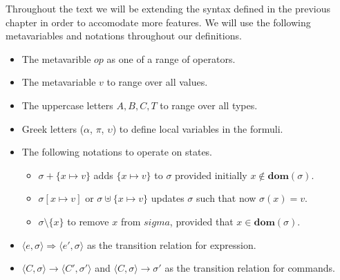 \documentclass[a4paper,12pt]{report}
\begin{document}
\par
Throughout the text we will be extending the syntax defined in the 
previous chapter in order to accomodate more features. 
We will use the following metavariables and notations throughout our 
definitions.

\renewcommand\labelitemii{$\blacksquare$}
\begin{itemize}
  \item The metavarible $op$ as one of a range of operators. 
  \item The metavariable $v$ to range over all values.
  \item The uppercase letters $A,B,C,T$ to range over all types.
  \item Greek letters ($\alpha$, $\pi$, $\upsilon$) to define local variables in 
  the formuli. 
  \item The following notations to operate on states. 
    \begin{itemize}
      \item $\sigma + \{x \mapsto v\}$ adds $\{x \mapsto v\}$ to $\sigma$ provided initially $x \notin\textbf{dom}(\sigma)$. 
      \item $\sigma[x \mapsto v]$ or $\sigma \uplus \{x \mapsto v\}$ updates $\sigma$ such that now $\sigma(x) = v$.
      \item $\sigma \setminus \{x\}$ to remove $x$ from $sigma$, provided that $x \in \textbf{dom}(\sigma)$.
    \end{itemize}
  \item $\langle e, \sigma \rangle \Longrightarrow \langle e', \sigma \rangle$ as the transition relation for expression.
  \item $\langle C, \sigma \rangle \longrightarrow \langle C', \sigma' \rangle$ and $\langle C, \sigma \rangle \longrightarrow \sigma'$ as the transition relation for commands.
\end{itemize}
\end{document}
